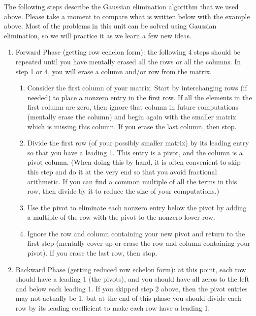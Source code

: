 The following steps describe the Gaussian elimination algorithm that we used above. 
Please take a moment to compare what is written below with the example above. 
Most of the problems in this unit can be solved using Gaussian elimination, so we will practice it as we learn a few new ideas.
\begin{enumerate}
\item Forward Phase (getting row echelon form): the following 4 steps should be repeated until you have mentally erased all the rows or all the columns. In step 1 or 4, you will erase a column and/or row from the matrix.
\begin{enumerate}
	\item
Consider the first column of your matrix. Start by interchanging rows (if needed) to place a nonzero entry in the first row. If all the elements in the first column are zero, then ignore that column in future computations (mentally erase the column) and begin again with the smaller matrix which is missing this column. If you erase the last column, then stop.
  \item 
  Divide the first row (of your possibly smaller matrix) by its leading entry so that you have a leading 1. This entry is a pivot, and the column is a pivot column. (When doing this by hand, it is often convenient to skip this step and do it at the very end so that you avoid fractional arithmetic. If you can find a common multiple of all the terms in this row, then divide by it to reduce the size of your computations.)
	\item Use the pivot to eliminate each nonzero entry below the pivot by adding a multiple of the row with the pivot to the nonzero lower row.
	\item 
	Ignore the row and column containing your new pivot and return to the first step (mentally cover up or erase the row and column containing your pivot). If you erase the last row, then stop.
\end{enumerate}
	\item Backward Phase (getting reduced row echelon form): at this point, each row should have a leading 1 (the pivots), and you should have all zeros to the left and below each leading 1. If you skipped step 2 above, then the pivot entries may not actually be 1, but at the end of this phase you should divide each row by its leading coefficient to make each row have a leading 1.

\end{enumerate}

